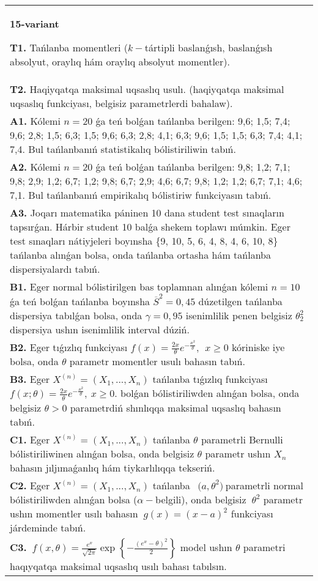 \documentclass{article}
\begin{document}
\begin{tabular}{m{17cm}}
\textbf{15-variant}
\newline

\textbf{T1.} 
Tańlanba momentleri (\(k -\)tártipli baslanǵısh, baslanǵısh absolyut, oraylıq hám oraylıq absolyut momentler).
 \\
\textbf{T2.} 
Haqiyqatqa maksimal uqsaslıq usulı. (haqiyqatqa maksimal uqsaslıq funkciyası, belgisiz parametrlerdi bahalaw).
 \\
\textbf{A1.} 
Kólemi \(n = 20\) ǵa teń bolǵan tańlanba berilgen: 9,6; 1,5; 7,4; 9,6; 2,8; 1,5; 6,3; 1,5; 9,6; 6,3; 2,8; 4,1; 6,3; 9,6; 1,5; 1,5; 6,3; 7,4; 4,1; 7,4. Bul tańlanbanıń statistikalıq bólistiriliwin tabıń.
 \\
\textbf{A2.} 
Kólemi \(n = 20\) ǵa teń bolǵan tańlanba berilgen: 9,8; 1,2; 7,1; 9,8; 2,9; 1,2; 6,7; 1,2; 9,8; 6,7; 2,9; 4,6; 6,7; 9,8; 1,2; 1,2; 6,7; 7,1; 4,6; 7,1. Bul tańlanbanıń empirikalıq bólistiriw funkciyasın tabıń.
 \\
\textbf{A3.} 
Joqarı matematika páninen 10 dana student test sınaqların tapsırǵan. Hárbir student 10 balǵa shekem toplawı múmkin. Eger test sınaqları nátiyjeleri boyınsha \{9, 10, 5, 6, 4, 8, 4, 6, 10, 8\} tańlanba alınǵan bolsa, onda tańlanba ortasha hám tańlanba dispersiyalardı tabıń.
 \\
\textbf{B1.} 
Eger normal bólistirilgen bas toplamnan alınǵan kólemi \(n = 10\) ǵa teń bolǵan tańlanba boyınsha \({\overline{S}}^{2} = 0,45\) dúzetilgen tańlanba dispersiya tabılǵan bolsa, onda \(\gamma = 0,95\) isenimlilik penen belgisiz \(\theta_{2}^{2}\) dispersiya ushın isenimlilik interval dúziń.
 \\
\textbf{B2.} 
Eger tıǵızlıq funkciyası \(f(x) = \frac{2x}{\theta}e^{- \frac{x^{2}}{\theta}},\ \ x \geq 0\) kóriniske iye bolsa, onda \(\theta\) parametr momentler usulı bahasın tabıń.
 \\
\textbf{B3.} 
Eger \(X^{(n)} = \left( X_{1},...,X_{n} \right)\) tańlanba tıǵızlıq funkciyası \(f(x;\theta) = \frac{2x}{\theta}e^{- \frac{x^{2}}{\theta}},\ x \geq 0\). bolǵan bólistiriliwden alınǵan bolsa, onda belgisiz \(\theta > 0\) parametrdiń shınlıqqa maksimal uqsaslıq bahasın tabıń.
 \\
\textbf{C1.} 
Eger \(X^{(n)} = \left( X_{1},...,X_{n} \right)\) tańlanba \(\theta\) parametrli Bernulli bólistiriliwinen alınǵan bolsa, onda belgisiz \(\theta\) parametr ushın \(X_{n}\) bahasın jıljımaǵanlıq hám tiykarlılıqqa tekseriń.
 \\
\textbf{C2.} 
Eger \(X^{(n)} = \left( X_{1},...,X_{n} \right)\) tańlanba \({\ \ (a,\theta}^{2})\ \)parametrli normal bólistiriliwden alınǵan bolsa (\(\alpha -\)belgili), onda belgisiz \({\ \theta}^{2}\) parametr ushın momentler usılı bahasın \({\ g(x) = (x - a)}^{2}\) funkciyası járdeminde tabıń.
 \\
\textbf{C3.} 
\(\ f(x,\theta) = \frac{e^{x}}{\sqrt{2\pi}}\exp\left\{ - \frac{\left( e^{x} - \theta \right)^{2}}{2} \right\}\) model ushın \(\theta\) parametri haqıyqatqa maksimal uqsaslıq usılı bahası tabılsın.
 \\

\end{tabular}
\vspace{1cm}
\end{document}
